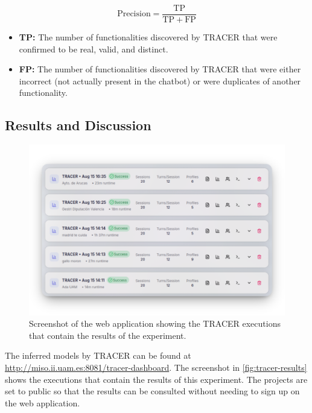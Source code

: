 \begin{equation}
\label{eq:precision}
\text{Precision} = \frac{\mathrm{TP}}{\mathrm{TP} + \mathrm{FP}}
\end{equation}

\begin{itemize}
  \item \textbf{\acf{TP}:}
    The number of functionalities discovered by \ac{TRACER}
    that were confirmed to be real, valid, and distinct.
  \item \textbf{\acf{FP}:}
    The number of functionalities discovered by \ac{TRACER}
    that were either incorrect
    (not actually present in the chatbot)
    or were duplicates of another functionality.
\end{itemize}

\subsection{Results and Discussion}

\begin{figure}[htpb]
  \begin{center}
    \includegraphics[width=\textwidth]{figures/tracer-results.png}
  \end{center}
  \caption{Screenshot of the web application showing
    the TRACER executions that contain the results of the experiment.}
  \label{fig:tracer-results}
\end{figure}

The inferred models by \ac{TRACER} can be found at
\url{http://miso.ii.uam.es:8081/tracer-dashboard}.
The screenshot in \autoref{fig:tracer-results}
shows the executions that contain the results of this experiment.
The projects are set to public
so that the results can be consulted
without needing to sign up on the web application.

